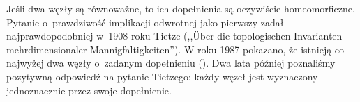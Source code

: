 Jeśli dwa węzły są równoważne, to ich dopełnienia są oczywiście homeomorficzne.
Pytanie o~prawdziwość implikacji odwrotnej jako pierwszy zadał najprawdopodobniej w~1908 roku Tietze (,,Über die topologischen Invarianten mehrdimensionaler Mannigfaltigkeiten'').
W roku 1987 pokazano, że istnieją co najwyżej dwa węzły o~zadanym dopełnieniu (\cite{culler87}).
Dwa lata później poznaliśmy pozytywną odpowiedź na pytanie Tietzego: każdy węzeł jest wyznaczony jednoznacznie przez swoje dopełnienie.

